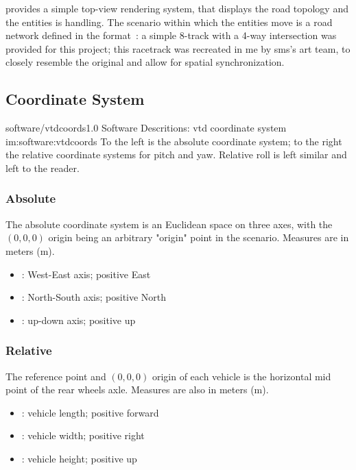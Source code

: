  provides a simple top-view rendering system, that displays the road topology and the entities  is handling. The scenario within which the entities move is a road network defined in the  format~\cite{software:opendrive}: a simple 8-track with a 4-way intersection was provided for this project; this racetrack was recreated in \gls{me} by \gls{sms}'s art team, to closely resemble the original and allow for spatial synchronization.

\subsection{Coordinate System}

\begin{image}
	{software/vtdcoords}{1.0}
	{Software Descritions: \gls{vtd} coordinate system}
	{im:software:vtdcoords}
	{}
	{To the left is the absolute coordinate system; to the right the relative coordinate systems for pitch and yaw. Relative roll is left similar and left to the reader.}
\end{image}

\subsubsection{Absolute}

The absolute coordinate system is an Euclidean space on three axes, with the $(0,0,0)$ origin being an arbitrary "origin" point in the scenario. Measures are in meters (\si{\meter}).

\begin{itemize}
	\item {}: West-East axis; positive East
	\item {}: North-South axis; positive North
	\item {}: up-down axis; positive up
\end{itemize}

\subsubsection{Relative}

The reference point and $(0,0,0)$ origin of each vehicle is the horizontal mid point of the rear wheels axle. Measures are also in meters (\si{\meter}).

\begin{itemize}
	\item {}: vehicle length; positive forward
	\item {}: vehicle width; positive right
	\item {}: vehicle height; positive up
\end{itemize}

